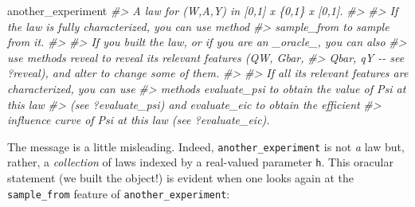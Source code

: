 \documentclass[
  11pt,
  openright,twoside]{book}
\newenvironment{Shaded}{\begin{snugshade}}{\end{snugshade}}
\newcommand{\CommentTok}[1]{\textcolor[rgb]{0.56,0.35,0.01}{\textit{#1}}}
\newcommand{\NormalTok}[1]{#1}
\theoremstyle{definition}
\theoremstyle{definition}
\theoremstyle{definition}
\theoremstyle{definition}
\theoremstyle{remark}
\begin{document}
\begin{Shaded}
\begin{Highlighting}[]
\NormalTok{another\_experiment}
\CommentTok{\#\textgreater{} A law for (W,A,Y) in [0,1] x \{0,1\} x [0,1].}
\CommentTok{\#\textgreater{} }
\CommentTok{\#\textgreater{} If the law is fully characterized, you can use method}
\CommentTok{\#\textgreater{} \textquotesingle{}sample\_from\textquotesingle{} to sample from it.}
\CommentTok{\#\textgreater{} }
\CommentTok{\#\textgreater{} If you built the law, or if you are an \_oracle\_, you can also}
\CommentTok{\#\textgreater{} use methods \textquotesingle{}reveal\textquotesingle{} to reveal its relevant features (QW, Gbar,}
\CommentTok{\#\textgreater{} Qbar, qY {-}{-} see \textquotesingle{}?reveal\textquotesingle{}), and \textquotesingle{}alter\textquotesingle{} to change some of them.}
\CommentTok{\#\textgreater{} }
\CommentTok{\#\textgreater{} If all its relevant features are characterized, you can use}
\CommentTok{\#\textgreater{} methods \textquotesingle{}evaluate\_psi\textquotesingle{} to obtain the value of \textquotesingle{}Psi\textquotesingle{} at this law}
\CommentTok{\#\textgreater{} (see \textquotesingle{}?evaluate\_psi\textquotesingle{}) and \textquotesingle{}evaluate\_eic\textquotesingle{} to obtain the efficient}
\CommentTok{\#\textgreater{} influence curve of \textquotesingle{}Psi\textquotesingle{} at this law (see \textquotesingle{}?evaluate\_eic\textquotesingle{}).}
\end{Highlighting}
\end{Shaded}

The message is a little misleading. Indeed, \texttt{another\_experiment} is not \emph{a}
law but, rather, a \emph{collection} of laws indexed by a real-valued parameter
\texttt{h}. This oracular statement (we built the object!) is evident when one looks
again at the \texttt{sample\_from} feature of \texttt{another\_experiment}:
\end{document}
